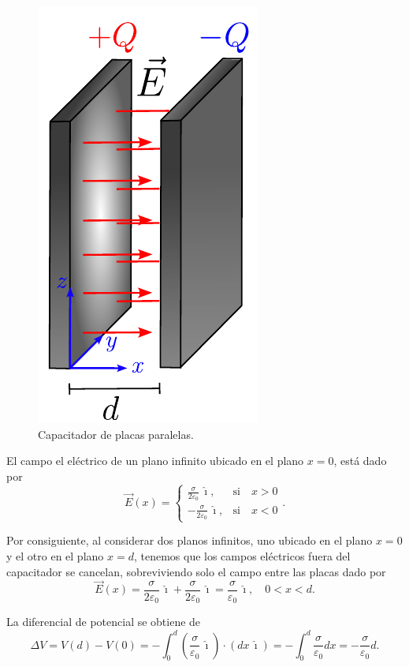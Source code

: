 \begin{figure}[H]
    \centering
    \includegraphics[scale = 0.8]{Figuras/Capacitador-Placas-Paralelas.pdf}
    \caption{Capacitador de placas paralelas.}
    \label{fig:Cap-Placas}
\end{figure}

El campo el eléctrico de un plano infinito ubicado en el plano $x = 0$, está dado por
$$\Vec{E}(x) =  \left\{ \begin{array}{cl}
   \frac{\sigma}{2 \varepsilon_0} \,\hat{\imath} ,  & \text{si} \quad x > 0  \\
    - \frac{\sigma}{2 \varepsilon_0} \,\hat{\imath}, & \text{si} \quad  x < 0 
\end{array} \right. .$$

Por consiguiente, al considerar dos planos infinitos, uno ubicado en el plano $x = 0$ y el otro en el plano $x = d$, tenemos que los campos eléctricos fuera del capacitador se cancelan, sobreviviendo solo el campo entre las placas dado por
$$\Vec{E}(x) = \frac{\sigma}{2\varepsilon_0} \,\hat{\imath} + \frac{\sigma}{2\varepsilon_0} \,\hat{\imath} = \frac{\sigma}{\varepsilon_0} \,\hat{\imath}, \quad 0 < x < d.$$

La diferencial de potencial se obtiene de
$$\Delta V = V(d) - V(0) = - \int_0^d \left(\frac{\sigma}{\varepsilon_0} \,\hat{\imath} \right) \cdot (dx\,\hat{\imath}) = - \int_0^d \frac{\sigma}{\varepsilon_0} dx = - \frac{\sigma}{\varepsilon_0} d.$$

